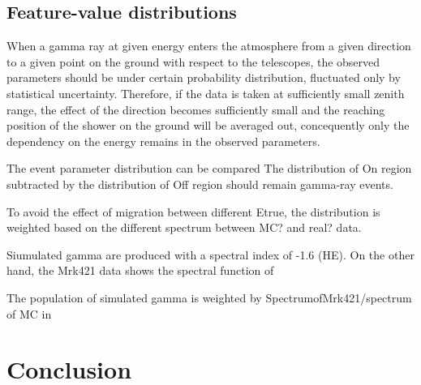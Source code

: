 \documentclass[preprint,12pt,authoryear]{elsarticle}
\begin{document}
\subsection{Feature-value distributions}
When a gamma ray at given energy enters the atmosphere from a given direction to a given point on the ground with respect to the telescopes, the observed parameters should be under certain probability distribution, fluctuated only by statistical uncertainty.
Therefore, if the data is taken at sufficiently small zenith range, the effect of the direction becomes sufficiently small and the reaching position of the shower on the ground will be averaged out, concequently only the dependency on the energy remains in the observed parameters.




The event parameter distribution can be compared 
The distribution of On region subtracted by the distribution of Off region should remain gamma-ray events.

To avoid the effect of migration between different Etrue,
 the distribution is weighted based on the different spectrum between  MC?  and real? data.

Siumulated gamma are produced with a spectral index of -1.6 (HE). 
On the other hand, the Mrk421 data shows the spectral function of

The population of simulated gamma is weighted by 
SpectrumofMrk421/spectrum of MC
in 





\section{Conclusion}

\begin{thebibliography}{00}



\end{thebibliography}
\end{document}
